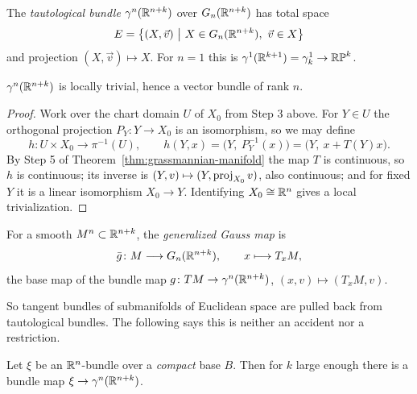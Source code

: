 \begin{definition}
The \emph{tautological bundle} $\gamma^n(\mathbb{R}^{n+k})$ over $G_n(\mathbb{R}^{n+k})$ has
total space
\[
E=\big\{(X,\vec v)\ \big|\ X\in G_n(\R^{n+k}),\ \vec v\in X\big\}
\]
and projection $(X,\vec v)\mapsto X$. For $n=1$ this is
$\gamma^1(\mathbb{R}^{k+1})=\gamma^1_k\to\mathbb{RP}^k$.
\end{definition}

\begin{lemma}\label{lem:tautological-locally-trivial}
$\gamma^n(\mathbb{R}^{n+k})$ is locally trivial, hence a vector bundle of rank $n$.
\end{lemma}

\begin{proof}
Work over the chart domain $U$ of $X_0$ from Step 3 above. For $Y\in U$ the
orthogonal projection $P_Y\colon Y\to X_0$ is an isomorphism, so we may define
\[
h\colon U\times X_0\longrightarrow\pi^{-1}(U),
\qquad
h(Y,x)=\big(Y,\ P_Y^{-1}(x)\big)=\big(Y,\ x+T(Y)x\big).
\]
By Step 5 of Theorem~\ref{thm:grassmannian-manifold} the map $T$ is continuous,
so $h$ is continuous; its inverse is $(Y,v)\mapsto(Y,\operatorname{proj}_{X_0}v)$, also
continuous; and for fixed $Y$ it is a linear isomorphism $X_0\to Y$. Identifying
$X_0\cong\mathbb{R}^n$ gives a local trivialization.
\end{proof}

\begin{definition}
For a smooth $M^n\subset\mathbb{R}^{n+k}$, the \emph{generalized Gauss map} is
\[
\bar g\colon M\longrightarrow G_n(\mathbb{R}^{n+k}),
\qquad
x\longmapsto T_xM,
\]
the base map of the bundle map
$g\colon TM\to\gamma^n(\mathbb{R}^{n+k})$, $(x,v)\mapsto(T_xM,v)$.
\end{definition}

So tangent bundles of submanifolds of Euclidean space are pulled back from
tautological bundles. The following says this is neither an accident nor a
restriction.

\begin{lemma}\label{lem:compact-classify}
Let $\xi$ be an $\mathbb{R}^n$-bundle over a \emph{compact} base $B$. Then for $k$ large
enough there is a bundle map $\xi\to\gamma^n(\mathbb{R}^{n+k})$.
\end{lemma}

